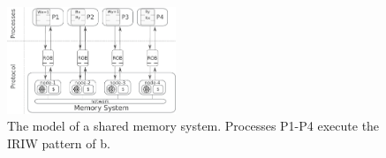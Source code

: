 \begin{figure}[t]
  \centering
  \includegraphics[width=0.45\textwidth]{1_figures/intro-model.pdf}
  \caption{The model of a shared memory system. Processes P1-P4 execute the IRIW pattern of b. }
  \vspace{-1em}
  \label{fig:intro-mod}
\end{figure}
